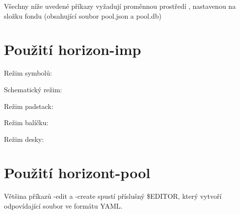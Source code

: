 \documentclass[letterpaper,10pt,czech]{sphinxmanual}
\begin{document}
Všechny níže uvedené příkazy vyžadují proměnnou prostředí
, nastavenou na složku fondu (obsahující soubor pool.json a pool.db)


\section{Použití horizon-imp}
\label{\detokenize{cli-usage:pouziti-horizon-imp}}
\begin{DUlineblock}{0em}
\item[] Režim symbolů:
\item[] 
\end{DUlineblock}

\begin{DUlineblock}{0em}
\item[] Schematický režim:
\item[] 
\end{DUlineblock}

\begin{DUlineblock}{0em}
\item[] Režim padstack:
\item[] 
\end{DUlineblock}

\begin{DUlineblock}{0em}
\item[] Režim balíčku:
\item[] 
\end{DUlineblock}

\begin{DUlineblock}{0em}
\item[] Režim desky:
\item[] 
\end{DUlineblock}


\section{Použití horizont-pool}
\label{\detokenize{cli-usage:pouziti-horizont-pool}}
Většina příkazů -edit a -create spustí příslušný \$EDITOR, který vytvoří odpovídající soubor ve formátu YAML.
\end{document}
